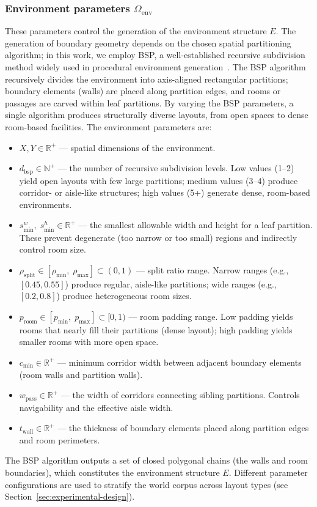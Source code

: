 \documentclass[conference]{IEEEtran}
\begin{document}
\subsubsection{Environment parameters $\Omega_{\text{env}}$}
These parameters control the generation of the environment structure $E$. The generation of boundary geometry depends on the chosen spatial partitioning algorithm; in this work, we employ BSP, a well-established recursive subdivision method widely used in procedural environment generation~\cite{shaker2016pcg}. The BSP algorithm recursively divides the environment into axis-aligned rectangular partitions; boundary elements (walls) are placed along partition edges, and rooms or passages are carved within leaf partitions. By varying the BSP parameters, a single algorithm produces structurally diverse layouts, from open spaces to dense room-based facilities.
The environment parameters are:
\begin{itemize}
    \item $X, Y \in \mathbb{R}^+$ --- spatial dimensions of the environment.
    \item $d_{\text{bsp}} \in \mathbb{N}^+$ --- the number of recursive subdivision levels. Low values (1--2) yield open layouts with few large partitions; medium values (3--4) produce corridor- or aisle-like structures; high values (5+) generate dense, room-based environments.
    \item $s_{\min}^{w},\; s_{\min}^{h} \in \mathbb{R}^+$ --- the smallest allowable width and height for a leaf partition. These prevent degenerate (too narrow or too small) regions and indirectly control room size.
    \item $\rho_{\text{split}} \in [\rho_{\min},\; \rho_{\max}] \subset (0, 1)$ --- split ratio range. Narrow ranges (e.g., $[0.45, 0.55]$) produce regular, aisle-like partitions; wide ranges (e.g., $[0.2, 0.8]$) produce heterogeneous room sizes.
    \item $p_{\text{room}} \in [p_{\min},\; p_{\max}] \subset [0, 1)$ --- room padding range. Low padding yields rooms that nearly fill their partitions (dense layout); high padding yields smaller rooms with more open space.
    \item $c_{\min} \in \mathbb{R}^+$ --- minimum corridor width between adjacent boundary elements (room walls and partition walls).
    \item $w_{\text{pass}} \in \mathbb{R}^+$ --- the width of corridors connecting sibling partitions. Controls navigability and the effective aisle width.
    \item $t_{\text{wall}} \in \mathbb{R}^+$ --- the thickness of boundary elements placed along partition edges and room perimeters.
\end{itemize}
The BSP algorithm outputs a set of closed polygonal chains (the walls and room boundaries), which constitutes the environment structure $E$. Different parameter configurations are used to stratify the world corpus across layout types (see Section~\ref{sec:experimental-design}).
 
\end{document}
